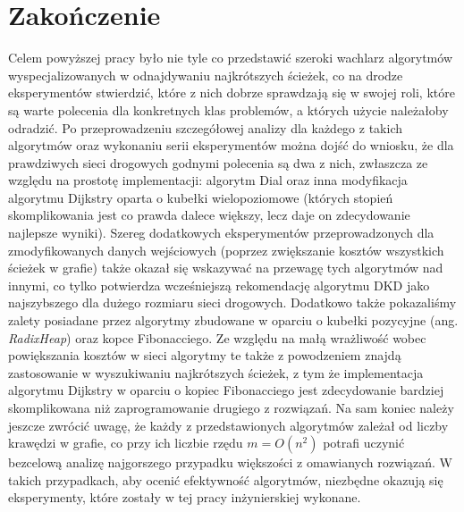 \chapter{Zakończenie}
\thispagestyle{chapterBeginStyle}





Celem powyższej pracy było nie tyle co przedstawić szeroki wachlarz algorytmów wyspecjalizowanych w odnajdywaniu najkrótszych ścieżek, co na drodze eksperymentów stwierdzić, które z nich dobrze sprawdzają się w swojej roli, które są warte polecenia dla konkretnych klas problemów, a których użycie należałoby odradzić.
Po przeprowadzeniu szczegółowej analizy dla każdego z takich algorytmów oraz wykonaniu serii eksperymentów można dojść do wniosku, że dla prawdziwych sieci drogowych godnymi polecenia są dwa z nich, zwłaszcza ze względu na prostotę implementacji: algorytm Dial oraz inna modyfikacja algorytmu Dijkstry oparta o kubełki wielopoziomowe (których stopień skomplikowania jest co prawda dalece większy, lecz daje on zdecydowanie najlepsze wyniki).
Szereg dodatkowych eksperymentów przeprowadzonych dla zmodyfikowanych danych wejściowych (poprzez zwiększanie kosztów wszystkich ścieżek w grafie) także okazał się wskazywać na przewagę tych algorytmów nad innymi, co tylko potwierdza wcześniejszą rekomendację algorytmu \textsc{DKD} jako najszybszego dla dużego rozmiaru sieci drogowych.
Dodatkowo także pokazaliśmy zalety posiadane przez algorytmy zbudowane w oparciu o kubełki pozycyjne (ang. \textit{RadixHeap}) oraz kopce Fibonacciego.
Ze względu na małą wrażliwość wobec powiększania kosztów w sieci algorytmy te także z powodzeniem znajdą zastosowanie w wyszukiwaniu najkrótszych ścieżek, z tym że implementacja algorytmu Dijkstry w oparciu o kopiec Fibonacciego jest zdecydowanie bardziej skomplikowana niż zaprogramowanie drugiego z rozwiązań.
Na sam koniec należy jeszcze zwrócić uwagę, że każdy z przedstawionych algorytmów zależał od liczby krawędzi w grafie, co przy ich liczbie rzędu $m = O \left( n^2 \right)$ potrafi uczynić bezcelową analizę najgorszego przypadku większości z omawianych rozwiązań. W takich przypadkach, aby ocenić efektywność algorytmów, niezbędne okazują się eksperymenty, które zostały w tej pracy inżynierskiej wykonane.